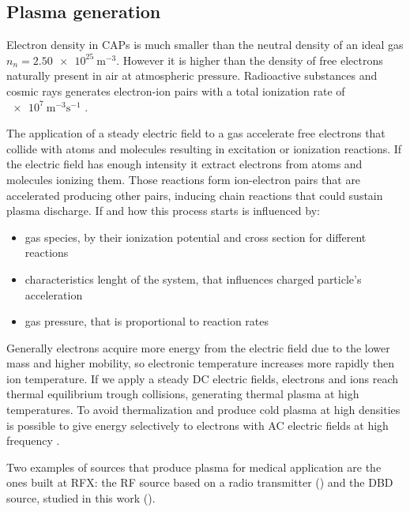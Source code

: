 \subsection{Plasma generation}
Electron density in CAPs is much smaller than the neutral density of an ideal gas $n_{n} = \SI{2.50e25}{\meter^{-3}}$. However it is higher than the density of free electrons naturally present in air at atmospheric pressure. Radioactive substances and cosmic rays generates electron-ion pairs with a total ionization rate of $\SI{e7}{\meter^{-3}\second^{-1}}$ \cite{book:1593058}.

The application of a steady electric field to a gas accelerate free electrons that collide with atoms and molecules resulting in excitation or ionization reactions. If the electric field has enough intensity it extract electrons from atoms and molecules ionizing them. Those reactions form ion-electron pairs that are accelerated producing other pairs, inducing chain reactions that could sustain plasma discharge. If and how this process starts is influenced by:
\begin{itemize}
 \item gas species, by their ionization potential and cross section for different reactions
 \item characteristics lenght of the system, that influences charged particle's acceleration
 \item gas pressure, that is proportional to reaction rates
\end{itemize}

Generally electrons acquire more energy from the electric field due to the lower mass and higher mobility, so electronic temperature increases more rapidly then ion temperature. If we apply a steady DC electric fields, electrons and ions reach thermal equilibrium trough collisions, generating thermal plasma at high temperatures. To avoid thermalization and produce cold plasma at high densities is possible to give energy selectively to electrons with AC electric fields at high frequency \cite{BARDOS20106705}.


Two examples of sources that produce plasma for medical application are the ones built at RFX: the RF source based on a radio transmitter (\cite{Martines_2009}) and the DBD source, studied in this work (\cite{DeMasi_2018}).

